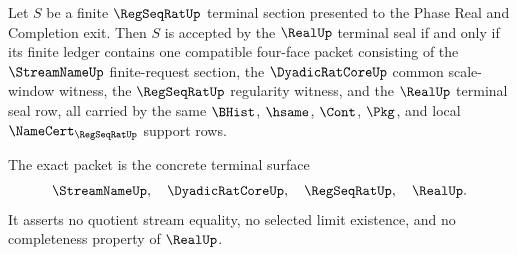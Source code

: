 \begin{theorem}
\label{thm:regseqrat-real-terminal-four-face-exactness}
Let $S$ be a finite $\RegSeqRatUp$ terminal section presented to the Phase Real
and Completion exit. Then $S$ is accepted by the $\RealUp$ terminal seal if and
only if its finite ledger contains one compatible four-face packet consisting
of the $\StreamNameUp$ finite-request section, the $\DyadicRatCoreUp$ common
scale-window witness, the $\RegSeqRatUp$ regularity witness, and the $\RealUp$
terminal seal row, all carried by the same $\BHist$, $\hsame$, $\Cont$, $\Pkg$,
and local $\NameCert_{\RegSeqRatUp}$ support rows.

The exact packet is the concrete terminal surface
$$
\StreamNameUp,\quad \DyadicRatCoreUp,\quad \RegSeqRatUp,\quad \RealUp.
$$
It asserts no quotient stream equality, no selected limit existence, and no
completeness property of $\RealUp$.
\end{theorem}
